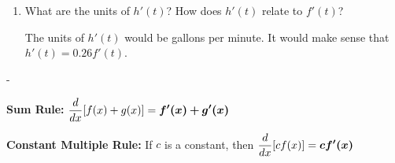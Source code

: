 \documentclass{article}
\makeatletter
\newlength{\tipmargin}
\renewenvironment{framed}{
  \setlength{\tipmargin}{\textwidth-\linewidth}
  \advance\@totalleftmargin-\tipmargin
  \def\FrameCommand{\hspace{\tipmargin}\fbox}%
  \advance\linewidth\tipmargin
  \MakeFramed {\advance\hsize-\width \FrameRestore}%
}
{\endMakeFramed}
\makeatother
\begin{document}
\begin{enumerate}[resume, topsep=0pt]
\begin{enumerate}
    \begin{solution}
      $h(t) = 0.26 f(t)$. 
    \end{solution}

  \item
    \begin{problem}[\vfill]
      What are the units of $h'(t)$?  How does $h'(t)$ relate to $f'(t)$? 
    \end{problem}

    \begin{solution}
      The units of $h'(t)$ would be gallons per minute. It would make sense that
      $h'(t) = 0.26 f'(t)$. 
    \end{solution}

  \end{enumerate}

\end{enumerate}
\begin{framed}
  \textbf{Sum Rule:} $\displaystyle \frac{d}{dx} [f(x) + g(x)] = \bm{f'(x) +g'(x)}$

  \textbf{Constant Multiple Rule:} If $c$ is a constant, then $\displaystyle \frac{d}{dx} [c f(x)] = \bm{c f'(x)}$
\end{framed}
\end{document}
